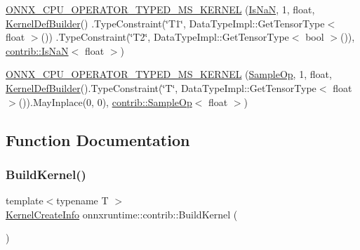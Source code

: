 \begin{DoxyCompactItemize}
\item 
\mbox{\hyperlink{namespaceonnxruntime_1_1contrib_a8eeb043219c951c5e40d00df0db24171}{O\+N\+N\+X\+\_\+\+C\+P\+U\+\_\+\+O\+P\+E\+R\+A\+T\+O\+R\+\_\+\+T\+Y\+P\+E\+D\+\_\+\+M\+S\+\_\+\+K\+E\+R\+N\+EL}} (\mbox{\hyperlink{classonnxruntime_1_1contrib_1_1IsNaN}{Is\+NaN}}, 1, float, \mbox{\hyperlink{classonnxruntime_1_1KernelDefBuilder}{Kernel\+Def\+Builder}}() .Type\+Constraint(\char`\"{}T1\char`\"{}, Data\+Type\+Impl\+::\+Get\+Tensor\+Type$<$ float $>$()) .Type\+Constraint(\char`\"{}T2\char`\"{}, Data\+Type\+Impl\+::\+Get\+Tensor\+Type$<$ bool $>$()), \mbox{\hyperlink{classonnxruntime_1_1contrib_1_1IsNaN}{contrib\+::\+Is\+NaN}}$<$ float $>$)
\item 
\mbox{\hyperlink{namespaceonnxruntime_1_1contrib_a02d3c18d1394c202a94e4f1e7f51f514}{O\+N\+N\+X\+\_\+\+C\+P\+U\+\_\+\+O\+P\+E\+R\+A\+T\+O\+R\+\_\+\+T\+Y\+P\+E\+D\+\_\+\+M\+S\+\_\+\+K\+E\+R\+N\+EL}} (\mbox{\hyperlink{classonnxruntime_1_1contrib_1_1SampleOp}{Sample\+Op}}, 1, float, \mbox{\hyperlink{classonnxruntime_1_1KernelDefBuilder}{Kernel\+Def\+Builder}}().Type\+Constraint(\char`\"{}T\char`\"{}, Data\+Type\+Impl\+::\+Get\+Tensor\+Type$<$ float $>$()).May\+Inplace(0, 0), \mbox{\hyperlink{classonnxruntime_1_1contrib_1_1SampleOp}{contrib\+::\+Sample\+Op}}$<$ float $>$)
\end{DoxyCompactItemize}


\subsection{Function Documentation}
\mbox{\label{namespaceonnxruntime_1_1contrib_a9d0f26b3ab6255e75af689b5f7918861}} 
\subsubsection{\texorpdfstring{Build\+Kernel()}{BuildKernel()}}
{\footnotesize\ttfamily template$<$typename T $>$ \\
\mbox{\hyperlink{structonnxruntime_1_1KernelCreateInfo}{Kernel\+Create\+Info}} onnxruntime\+::contrib\+::\+Build\+Kernel (\begin{DoxyParamCaption}{ }\end{DoxyParamCaption})}

\mbox{\label{namespaceonnxruntime_1_1contrib_a02d3c18d1394c202a94e4f1e7f51f514}} 
